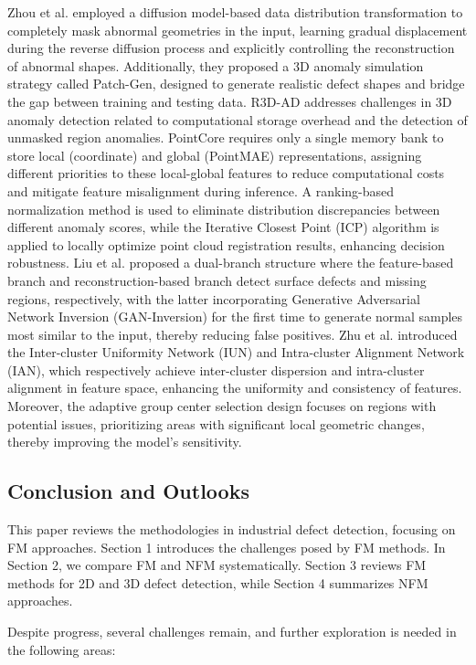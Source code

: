 \documentclass[journal,comsoc]{IEEEtran}
\begin{document}
Zhou et al. \cite{zhou2025r3d} employed a diffusion model-based data distribution transformation to completely mask abnormal geometries in the input, learning gradual displacement during the reverse diffusion process and explicitly controlling the reconstruction of abnormal shapes. Additionally, they proposed a 3D anomaly simulation strategy called Patch-Gen, designed to generate realistic defect shapes and bridge the gap between training and testing data. R3D-AD addresses challenges in 3D anomaly detection related to computational storage overhead and the detection of unmasked region anomalies. PointCore requires only a single memory bank to store local (coordinate) and global (PointMAE) representations, assigning different priorities to these local-global features to reduce computational costs and mitigate feature misalignment during inference. A ranking-based normalization method is used to eliminate distribution discrepancies between different anomaly scores, while the Iterative Closest Point (ICP) algorithm is applied to locally optimize point cloud registration results, enhancing decision robustness. Liu et al. \cite{liu2024uni} proposed a dual-branch structure where the feature-based branch and reconstruction-based branch detect surface defects and missing regions, respectively, with the latter incorporating Generative Adversarial Network Inversion (GAN-Inversion) for the first time to generate normal samples most similar to the input, thereby reducing false positives. Zhu et al. \cite{zhu2024group3ad} introduced the Inter-cluster Uniformity Network (IUN) and Intra-cluster Alignment Network (IAN), which respectively achieve inter-cluster dispersion and intra-cluster alignment in feature space, enhancing the uniformity and consistency of features. Moreover, the adaptive group center selection design focuses on regions with potential issues, prioritizing areas with significant local geometric changes, thereby improving the model's sensitivity.

\subsection{Conclusion and Outlooks}
This paper reviews the methodologies in industrial defect detection, focusing on FM approaches. Section 1 introduces the challenges posed by FM methods. In Section 2, we compare FM and NFM systematically. Section 3 reviews FM methods for 2D and 3D defect detection, while Section 4 summarizes NFM approaches.

Despite progress, several challenges remain, and further exploration is needed in the following areas:
\end{document}
